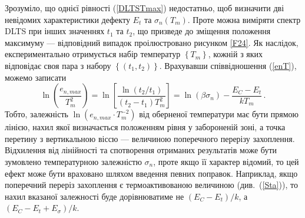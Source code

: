 Зрозуміло, що однієї рівності (\ref{DLTSTmax}) недостатньо,
щоб визначити дві невідомих характеристики дефекту $E_t$ та $\sigma_n(T_m)$.
Проте можна виміряти спектр DLTS при інших значеннях $t_1$ та $t_2$,
що призведе до зміщення положення максимуму --- відповідний випадок проілюстровано рисунком \ref{F24}.
Як наслідок, експериментально отримується набір температур $\left\{T_{m}\right\}$,
кожній з яких відповідає своя пара з набору  $\left\{(t_{1},t_{2})\right\}$.
Врахувавши співвідношення (\ref{enT}), можемо записати
\begin{equation}
\label{DLTSenT}
\ln\left(\frac{e_{n,max}}{T_m^2}\right)=\ln\left[\frac{\ln\left(t_2/t_1\right)}{\left(t_2-t_1\right)T_m^2}\right]=\ln\left(\beta\sigma_n\right)-\frac{E_C-E_t}{kT_m}\,.
\end{equation}
Тобто, залежність $\ln(e_{n,max}\cdot T_m^{-2})$ від оберненої температури має бути прямою лінією,
нахил якої визначається положенням рівня у забороненій зоні, а точка перетину з вертикальною віссю ---
величиною поперечного перерізу захоплення.
Відхилення від лінійності та спотворення отриманих результатів може бути зумовлено температурною залежністю
$\sigma_n$, проте якщо її характер відомий, то цей ефект може бути враховано шляхом введення певних поправок.
Наприклад, якщо поперечний переріз захоплення є термоактивованою величиною (див.~(\ref{Sta})),
то нахил вказаної залежності буде дорівнюватиме не $(E_C-E_t)/k$, а $(E_C-E_t+E_{\sigma})/k$.




